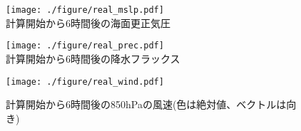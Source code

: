 \begin{figure}[h]
\begin{center}
  \texttt{[image: ./figure/real\_mslp.pdf]}\\
  \caption{計算開始から6時間後の海面更正気圧}
  \label{fig:real_mslp}
\end{center}
\begin{center}
  \texttt{[image: ./figure/real\_prec.pdf]}\\
  \caption{計算開始から6時間後の降水フラックス}
  \label{fig:real_prec}
\end{center}
\begin{center}
  \texttt{[image: ./figure/real\_wind.pdf]}\\
  \caption{計算開始から6時間後の850hPaの風速(色は絶対値、ベクトルは向き)}
  \label{fig:real_wind}
\end{center}
\end{figure}
